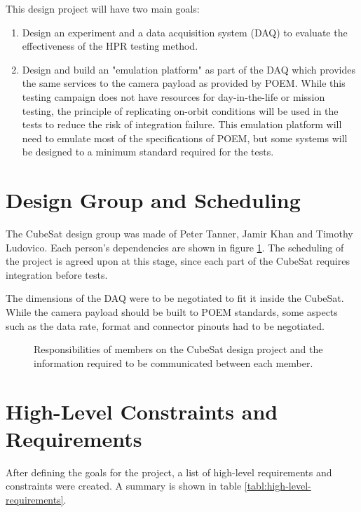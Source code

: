 \documentclass{report}
\begin{document}
This design project will have two main goals:

\begin{enumerate}
  \item Design an experiment and a data acquisition system (DAQ) to evaluate the effectiveness of the HPR testing method.
  \item Design and build an "emulation platform" as part of the DAQ which provides the same services to the camera payload as provided by POEM. While this testing campaign does not have resources for day-in-the-life or mission testing, the principle of replicating on-orbit conditions will be used in the tests to reduce the risk of integration failure. This emulation platform will need to emulate most of the specifications of POEM, but some systems will be designed to a minimum standard required for the tests.
\end{enumerate}

\section{Design Group and Scheduling}

The CubeSat design group was made of Peter Tanner, Jamir Khan and Timothy Ludovico. Each person's dependencies are shown in figure \ref{fig:cubesat-responsibilities}. The scheduling of the project is agreed upon at this stage, since each part of the CubeSat requires integration before tests.

The dimensions of the DAQ were to be negotiated to fit it inside the CubeSat. While the camera payload should be built to POEM standards, some aspects such as the data rate, format and connector pinouts had to be negotiated.

\begin{figure}[H]
  \centering
  
  \caption{Responsibilities of members on the CubeSat design project and the information required to be communicated between each member.}
  \label{fig:cubesat-responsibilities}
\end{figure}

\section{High-Level Constraints and Requirements}

After defining the goals for the project, a list of high-level requirements and constraints were created. A summary is shown in table \ref{tabl:high-level-requirements}.
\end{document}

